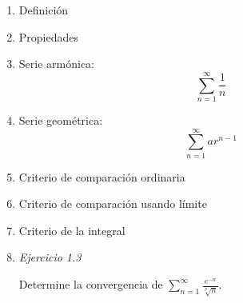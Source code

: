 \begin{enumerate}
 \item Definición
 
 \vspace{120pt}
 
 
 \item Propiedades
 
 \vspace{120pt}
 
 
 \item Serie armónica: \[\sum_{n=1}^{\infty}\frac{1}{n}\]
 
 \vspace{120pt}
 
 
 \item Serie geométrica: $$\sum_{n=1}^{\infty}ar^{n-1}$$
 
 \newpage
 
 
 \item Criterio de comparación ordinaria
 
  \vspace{100pt}
 
 
 \item Criterio de comparación usando límite

   \vspace{120pt}
 
 
 \item Criterio de la integral
 
   \vspace{120pt}
 
 
 \item \textit{Ejercicio 1.3}
 
 Determine la convergencia de $\displaystyle \sum_{n=1}^{\infty}\frac{e^{-n}}{\sqrt[p]{n}}$.
 

 
\end{enumerate}




